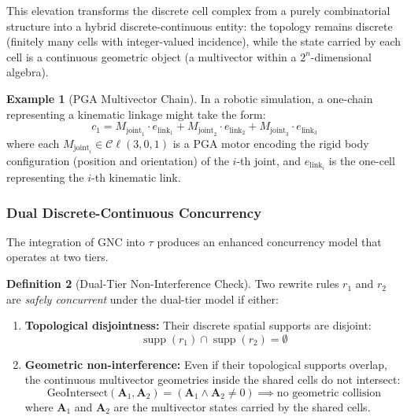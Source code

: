 \documentclass[manuscript, nonacm, review=false]{acmart}
\theoremstyle{definition}
\newtheorem{definition}{Definition}[section]
\newtheorem{example}[definition]{Example}
\theoremstyle{plain}
\newcommand{\Cl}{\mathcal{C}\!\ell}
\newcommand{\supp}{\operatorname{supp}}
\newcommand{\toposLang}{\ensuremath{\tau}\text{-Lang}}
\begin{document}
This elevation transforms the discrete cell complex from a purely combinatorial structure into a hybrid discrete-continuous entity: the topology remains discrete (finitely many cells with integer-valued incidence), while the state carried by each cell is a continuous geometric object (a multivector within a $2^n$-dimensional algebra).

\begin{example}[PGA Multivector Chain]
\label{ex:pga_chain}
In a robotic simulation, a one-chain representing a kinematic linkage might take the form:
\begin{equation}
    c_1 = M_{\text{joint}_1} \cdot e_{\text{link}_1} + M_{\text{joint}_2} \cdot e_{\text{link}_2} + M_{\text{joint}_3} \cdot e_{\text{link}_3}
\end{equation}
where each $M_{\text{joint}_i} \in \Cl(3,0,1)$ is a PGA motor encoding the rigid body configuration (position and orientation) of the $i$-th joint, and $e_{\text{link}_i}$ is the one-cell representing the $i$-th kinematic link.
\end{example}


\subsubsection{Dual Discrete-Continuous Concurrency}

The integration of GNC into \toposLang{} produces an enhanced concurrency model that operates at two tiers.

\begin{definition}[Dual-Tier Non-Interference Check]
\label{def:dual_tier}
Two rewrite rules $r_1$ and $r_2$ are \emph{safely concurrent} under the dual-tier model if either:
\begin{enumerate}[label=(\roman*)]
    \item \textbf{Topological disjointness:} Their discrete spatial supports are disjoint:
    \begin{equation}
        \supp(r_1) \cap \supp(r_2) = \emptyset
    \end{equation}
    \item \textbf{Geometric non-interference:} Even if their topological supports overlap, the continuous multivector geometries inside the shared cells do not intersect:
    \begin{equation}
        \text{GeoIntersect}(\mathbf{A}_1, \mathbf{A}_2) = (\mathbf{A}_1 \wedge \mathbf{A}_2 \neq 0) \implies \text{no geometric collision}
    \end{equation}
    where $\mathbf{A}_1$ and $\mathbf{A}_2$ are the multivector states carried by the shared cells.
\end{enumerate}
\end{definition}
\end{document}

